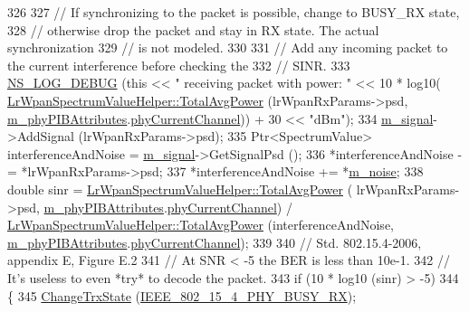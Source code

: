 \begin{DoxyCode}
326 
327       \textcolor{comment}{// If synchronizing to the packet is possible, change to BUSY\_RX state,}
328       \textcolor{comment}{// otherwise drop the packet and stay in RX state. The actual synchronization}
329       \textcolor{comment}{// is not modeled.}
330 
331       \textcolor{comment}{// Add any incoming packet to the current interference before checking the}
332       \textcolor{comment}{// SINR.}
333       \hyperlink{group__logging_ga413f1886406d49f59a6a0a89b77b4d0a}{NS\_LOG\_DEBUG} (\textcolor{keyword}{this} << \textcolor{stringliteral}{" receiving packet with power: "} << 10 * log10(
      \hyperlink{classns3_1_1LrWpanSpectrumValueHelper_ab8f05acfb68822f7b94fc637311fbda6}{LrWpanSpectrumValueHelper::TotalAvgPower} (lrWpanRxParams->psd, 
      \hyperlink{classns3_1_1LrWpanPhy_a7f263bedbdeed627f7c5f2dab8e960c8}{m\_phyPIBAttributes}.\hyperlink{structns3_1_1LrWpanPhyPibAttributes_a8e620dfd0f5b45fa6c9525d93c498fcb}{phyCurrentChannel})) + 30 << \textcolor{stringliteral}{"dBm"});
334       \hyperlink{classns3_1_1LrWpanPhy_a923130b0bacef678012bcc8fdc68fd10}{m\_signal}->AddSignal (lrWpanRxParams->psd);
335       Ptr<SpectrumValue> interferenceAndNoise = \hyperlink{classns3_1_1LrWpanPhy_a923130b0bacef678012bcc8fdc68fd10}{m\_signal}->GetSignalPsd ();
336       *interferenceAndNoise -= *lrWpanRxParams->psd;
337       *interferenceAndNoise += *\hyperlink{classns3_1_1LrWpanPhy_a02560969747aa24f7bded61743f5cc37}{m\_noise};
338       \textcolor{keywordtype}{double} sinr = \hyperlink{classns3_1_1LrWpanSpectrumValueHelper_ab8f05acfb68822f7b94fc637311fbda6}{LrWpanSpectrumValueHelper::TotalAvgPower} (
      lrWpanRxParams->psd, \hyperlink{classns3_1_1LrWpanPhy_a7f263bedbdeed627f7c5f2dab8e960c8}{m\_phyPIBAttributes}.\hyperlink{structns3_1_1LrWpanPhyPibAttributes_a8e620dfd0f5b45fa6c9525d93c498fcb}{phyCurrentChannel}) / 
      \hyperlink{classns3_1_1LrWpanSpectrumValueHelper_ab8f05acfb68822f7b94fc637311fbda6}{LrWpanSpectrumValueHelper::TotalAvgPower} (interferenceAndNoise, 
      \hyperlink{classns3_1_1LrWpanPhy_a7f263bedbdeed627f7c5f2dab8e960c8}{m\_phyPIBAttributes}.\hyperlink{structns3_1_1LrWpanPhyPibAttributes_a8e620dfd0f5b45fa6c9525d93c498fcb}{phyCurrentChannel});
339 
340       \textcolor{comment}{// Std. 802.15.4-2006, appendix E, Figure E.2}
341       \textcolor{comment}{// At SNR < -5 the BER is less than 10e-1.}
342       \textcolor{comment}{// It's useless to even *try* to decode the packet.}
343       \textcolor{keywordflow}{if} (10 * log10 (sinr) > -5)
344         \{
345           \hyperlink{classns3_1_1LrWpanPhy_a149987679698c2878d941fac1238c41a}{ChangeTrxState} (\hyperlink{group__lr-wpan_gga6494269d13d45c511a07b7ccbb1de754a09f430974fda07ac7d4d483a1ce23b98}{IEEE\_802\_15\_4\_PHY\_BUSY\_RX});

\end{DoxyCode}
